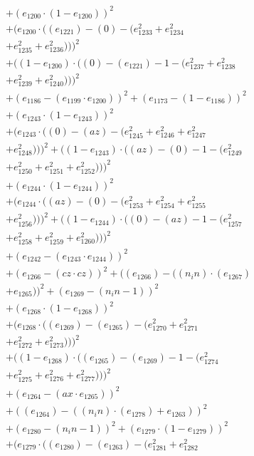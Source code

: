 \documentclass[10pt, a4paper]{article}
\begin{document}
\begin{align*}
& + (e_{1200}  \cdot  (1 - e_{1200}))^{2} \\
& + (e_{1200}  \cdot  ((e_{1221}) - (0) - (e_{1233}^{2} + e_{1234}^{2} \\
& + e_{1235}^{2} + e_{1236}^{2})))^{2} \\
& + ((1 - e_{1200})  \cdot  ((0) - (e_{1221}) - 1 - (e_{1237}^{2} + e_{1238}^{2} \\
& + e_{1239}^{2} + e_{1240}^{2})))^{2} \\
& + (e_{1186} - (e_{1199}  \cdot  e_{1200}))^{2} + (e_{1173} - (1 - e_{1186}))^{2} \\
& + (e_{1243}  \cdot  (1 - e_{1243}))^{2} \\
& + (e_{1243}  \cdot  ((0) - (az) - (e_{1245}^{2} + e_{1246}^{2} + e_{1247}^{2} \\
& + e_{1248}^{2})))^{2} + ((1 - e_{1243})  \cdot  ((az) - (0) - 1 - (e_{1249}^{2} \\
& + e_{1250}^{2} + e_{1251}^{2} + e_{1252}^{2})))^{2} \\
& + (e_{1244}  \cdot  (1 - e_{1244}))^{2} \\
& + (e_{1244}  \cdot  ((az) - (0) - (e_{1253}^{2} + e_{1254}^{2} + e_{1255}^{2} \\
& + e_{1256}^{2})))^{2} + ((1 - e_{1244})  \cdot  ((0) - (az) - 1 - (e_{1257}^{2} \\
& + e_{1258}^{2} + e_{1259}^{2} + e_{1260}^{2})))^{2} \\
& + (e_{1242} - (e_{1243}  \cdot  e_{1244}))^{2} \\
& + (e_{1266} - (cz  \cdot  cz))^{2} + ((e_{1266}) - ((n_in)  \cdot  (e_{1267}) \\
& + e_{1265}))^{2} + (e_{1269} - (n_in - 1))^{2} \\
& + (e_{1268}  \cdot  (1 - e_{1268}))^{2} \\
& + (e_{1268}  \cdot  ((e_{1269}) - (e_{1265}) - (e_{1270}^{2} + e_{1271}^{2} \\
& + e_{1272}^{2} + e_{1273}^{2})))^{2} \\
& + ((1 - e_{1268})  \cdot  ((e_{1265}) - (e_{1269}) - 1 - (e_{1274}^{2} \\
& + e_{1275}^{2} + e_{1276}^{2} + e_{1277}^{2})))^{2} \\
& + (e_{1264} - (ax  \cdot  e_{1265}))^{2} \\
& + ((e_{1264}) - ((n_in)  \cdot  (e_{1278}) + e_{1263}))^{2} \\
& + (e_{1280} - (n_in - 1))^{2} + (e_{1279}  \cdot  (1 - e_{1279}))^{2} \\
& + (e_{1279}  \cdot  ((e_{1280}) - (e_{1263}) - (e_{1281}^{2} + e_{1282}^{2} \\

\end{align*}
\end{document}
